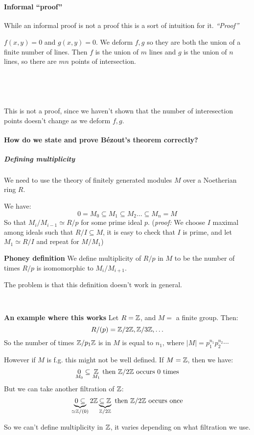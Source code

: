 \

\paragraph*{Informal ``proof''}
While an informal proof is not a proof this is a sort of intuition for it.
\textit{``Proof''}

    $f(x,y) = 0$ and $g(x,y) = 0$. We deform $f,g$ so they are both the union of a finite number of lines. Then $f$ is the union of $m$ lines and $g$ is the union of $n$ lines, so there are $mn$ points of intersection. 

\


\

This is not a proof, since we haven't shown that the number of interesection points doesn't change as we deform $f,g$.


\paragraph*{How do we state and prove Bézout's theorem correctly?}
\subparagraph*{Defining multiplicity}
We need to use the theory of finitely generated modules $M$ over a Noetherian ring $R$.

We have:\[0=M_0\subseteq M_1\subseteq M_2\ldots\subseteq M_n = M \]
So that $M_i/M_{i-1}\simeq R/p$ for some prime ideal $p$. 
(\textit{proof:} We choose $I$ maximal among ideals such that $R/I\subseteq M$, it is easy to check that $I$ is prime, and let $M_1\simeq R/I$ and repeat for $M/M_1$) 



\begin{definition}\textbf{Phoney definition}
    We define multiplicity of $R/p$ in $M$ to be the number of times $R/p$ is isomomorphic to $M_i/M_{i+1}$.
\end{definition}
The problem is that this definition doesn't work in general.

\

\begin{example}\textbf{An example where this works}
    Let $R=\mathbb{Z}$, and $M = $ a finite group. Then:\[
        R/(p) = \mathbb{Z}/2\mathbb{Z}, \mathbb{Z}/3\mathbb{Z},\ldots    
    \]
    So the number of times $\mathbb{Z}/p_1\mathbb{Z}$ is in $M$ is equal to $n_1$, where $|M| = p_1^{n_1}p_2^{n_2}\cdots$ 
\end{example}

\begin{example}
    However if $M$ is f.g. this might not be well defined. If $M=\mathbb{Z}$, then we have:\[
        \underset{M_0}{0}\subseteq \underset{M_1}{\mathbb{Z}} \text{ then }\mathbb{Z}/2\mathbb{Z} \text{ occurs }0\text{ times}
    \]
    But we can take another filtration of $\mathbb{Z}$:\[
        \underbrace{0\subseteq}_{\simeq \mathbb{Z}/(0)} 2\mathbb{Z} \underbrace{\subseteq \mathbb{Z}}_{\mathbb{Z}/2\mathbb{Z}} \text{ then }\mathbb{Z}/2\mathbb{Z} \text{ occurs once}    
    \]

    So we can't define multiplicity in $\mathbb{Z}$, it varies depending on what filtration we use.
\end{example}

